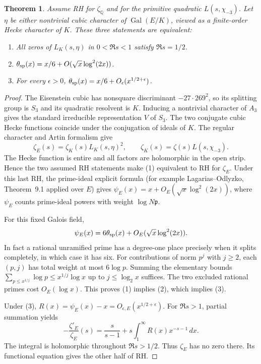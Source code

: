 \documentclass[11pt]{article}
\newtheorem{theorem}{Theorem}
\newcommand{\Q}{\mathbb Q}
\newcommand{\Gal}{\operatorname{Gal}}
\begin{document}
\begin{theorem}\label{thm:test}
Assume RH for \(\zeta_{\Q}\) and for the primitive quadratic
\(L(s,\chi_{-3})\). Let \(\eta\) be either nontrivial cubic character of
\(\Gal(E/K)\), viewed as a finite-order Hecke character of \(K\). These
three statements are equivalent:
\begin{enumerate}
\item All zeros of \(L_K(s,\eta)\) in \(0<\Re s<1\) satisfy \(\Re s=1/2\).
\item \(\theta_{\rm sp}(x)=x/6+O(\sqrt{x}\log^2(2x))\).
\item For every \(\epsilon>0\),
\(\theta_{\rm sp}(x)=x/6+O_\epsilon(x^{1/2+\epsilon})\).
\end{enumerate}
\end{theorem}
\begin{proof}
The Eisenstein cubic has nonsquare discriminant \(-27\cdot269^2\), so its
splitting group is \(S_3\) and its quadratic resolvent is \(K\). Inducing a
nontrivial character of \(A_3\) gives the standard irreducible representation
\(V\) of \(S_3\). The two conjugate cubic Hecke functions coincide under
the conjugation of ideals of \(K\). The regular character and Artin formalism give
\[
 \zeta_E(s)=\zeta_K(s)L_K(s,\eta)^2,\qquad
 \zeta_K(s)=\zeta(s)L(s,\chi_{-3}).
\]
The Hecke function is entire and all factors are holomorphic in the open
strip. Hence the two assumed RH statements make (1) equivalent to RH for
\(\zeta_E\). Under this last RH, the prime-ideal explicit formula
(for example Lagarias--Odlyzko, Theorem~9.1 applied over \(E\))
gives \(\psi_E(x)=x+O_E(\sqrt{x}\log^2(2x))\), where \(\psi_E\)
counts prime-ideal powers with weight \(\log N\mathfrak p\).

For this fixed Galois field,
\[
 \psi_E(x)=6\theta_{\rm sp}(x)+O_E(\sqrt{x}\log^2(2x)).
\]
In fact a rational unramified prime has a degree-one place precisely when
it splits completely, in which case it has six. For contributions of norm
\(p^j\) with \(j\ge2\), each \((p,j)\) has total weight at most
\(6\log p\). Summing the elementary bounds
\(\sum_{p\le x^{1/j}}\log p\le x^{1/j}\log x\) up to \(j\le\log_2x\)
suffices. The two excluded rational primes cost \(O_E(\log x)\).
This proves (1) implies (2), which implies (3).

Under (3), \(R(x)=\psi_E(x)-x=O_{\epsilon,E}(x^{1/2+\epsilon})\).
For \(\Re s>1\), partial summation yields
\[
 -\frac{\zeta'_E}{\zeta_E}(s)=\frac{s}{s-1}
                  +s\int_1^\infty R(x)x^{-s-1}\,dx .
\]
The integral is holomorphic throughout \(\Re s>1/2\). Thus \(\zeta_E\)
has no zero there. Its functional equation gives the other half of RH.
\end{proof}
\end{document}
